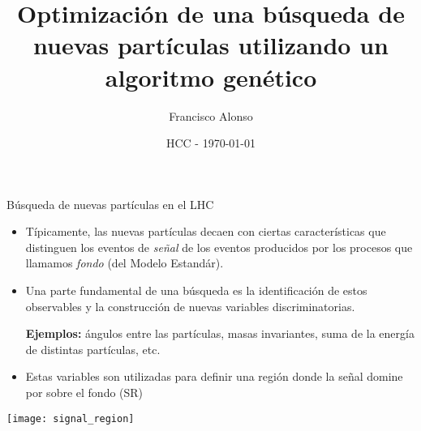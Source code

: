 \documentclass[center,10pt,cm]{beamer}
\title{\bf Optimizaci\'on de una b\'usqueda de nuevas part\'iculas utilizando un algoritmo gen\'etico}
\author{Francisco Alonso}
\institute{}
\date{HCC - \today}
\begin{document}
\centering

\begin{frame}[plain]
    \titlepage
\end{frame}

\begin{frame}{B\'usqueda de nuevas part\'iculas en el LHC}

  \begin{itemize}\itemsep0.5cm
  \item T\'ipicamente, las nuevas part\'iculas decaen con ciertas caracter\'isticas que distinguen los eventos de \emph{se\~nal}
    de los eventos producidos por los procesos que llamamos \emph{fondo} (del Modelo Estand\'ar).

  \item Una parte fundamental de una b\'usqueda es la identificaci\'on de estos observables y la construcci\'on de nuevas
    variables discriminatorias.

    {\small
    \begin{center}
      \textbf{Ejemplos:} \'angulos entre las part\'iculas, masas invariantes, suma de la energ\'ia de distintas part\'iculas, etc.
    \end{center}
    }

  \item Estas variables son utilizadas para definir una regi\'on donde la se\~nal domine por sobre el fondo (SR)

  \end{itemize}

  \begin{minipage}{0.5\textwidth}
    \centering
  \texttt{[image: signal\_region]}
  \end{minipage}%
  \begin{minipage}{0.5\textwidth}
    \centering
  \end{minipage}

\end{frame}
\end{document}

